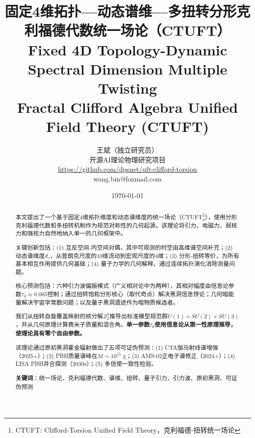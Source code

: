 \documentclass[12pt,a4paper]{article}
\title{\textbf{固定4维拓扑—动态谱维—多扭转分形克利福德代数统一场论（CTUFT）}\\[0.5em]
\large Fixed 4D Topology-Dynamic Spectral Dimension Multiple Twisting\\
Fractal Clifford Algebra Unified Field Theory (CTUFT)}
\author{王斌（独立研究员）\\
\small 开源AI理论物理研究项目\\
\small \url{https://github.com/dpsnet/uft-clifford-torsion}\\
\small wang.bin@foxmail.com}
\date{\today}
\theoremstyle{definition}
\theoremstyle{remark}
\begin{document}
\maketitle

\begin{abstract}
\noindent
本文提出了一个基于固定4维拓扑维度和动态谱维度的统一场论（CTUFT\footnote{CTUFT: Clifford-Torsion Unified Field Theory，克利福德-扭转统一场论}），使用分形克利福德代数和多扭转机制作为规范对称性的几何起源。该理论将引力、电磁力、弱核力和强核力自然地纳入单一的几何框架中。

关键创新包括：(1) 互反空间-内空间对偶，其中可观测的时空由高维谱空间补充；(2) 动态谱维度$d_s$，从普朗克尺度的10维流动到宏观尺度的4维；(3) 分形-扭转等价，为所有基本相互作用提供几何基础；(4) 量子力学的几何解释，通过连续拓扑演化消除测量问题。

核心预测包括：六种引力波偏振模式（广义相对论中为两种），其相对幅度由信息论参数$\tau_0 \approx 0.005$控制；通过扭转饱和分形核心（取代奇点）解决黑洞信息悖论；几何暗能量解决宇宙学常数问题；以及量子黑洞遗迹作为暗物质候选者。

我们从扭转自旋覆盖映射的核分解$Z_2^5$推导出标准模型规范群$U(1) \times SU(2) \times SU(3)$，并从几何原理计算费米子质量和混合角。\textbf{单一参数$\tau_0$使用信息论从第一性原理推导，使理论具有零个自由参数。}

该理论通过原初黑洞霍金辐射做出了五项可证伪预测：(1) CTA伽马射线谱增强（2025+）；(2) PBH质量谱峰在$M \sim 10^{15}$ g；(3) AMS-02正电子谱修正（2024+）；(4) LISA PBH并合探测（2030s）；(5) 多信使一致性检验。

\textbf{关键词}：统一场论、克利福德代数、谱维、扭转、量子引力、引力波、原初黑洞、可证伪预测
\end{abstract}

\tableofcontents
\newpage



























\end{document}
